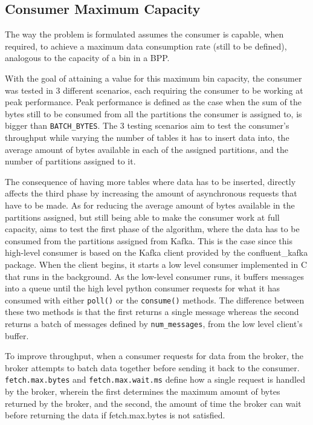 \subsection{Consumer Maximum Capacity}
\label{c3subsub:consumer_maximum_capacity}

The way the problem is formulated assumes the consumer is capable, when
required, to achieve a maximum data consumption rate (still to be defined),
analogous to the capacity of a bin in a BPP.

With the goal of attaining a value for this maximum bin capacity, the consumer
was tested in 3 different scenarios, each requiring the consumer to be working
at peak performance.  Peak performance is defined as the case when the sum of
the bytes still to be consumed from all the partitions the consumer is assigned
to, is bigger than \lstinline[language=Python]{BATCH_BYTES}.  The 3 testing
scenarios aim to test the consumer's throughput while varying the number of
tables it has to insert data into, the average amount of bytes available in each
of the assigned partitions, and the number of partitions assigned to it.

The consequence of having more tables where data has to be inserted, directly
affects the third phase by increasing the amount of asynchronous requests that
have to be made.  As for reducing the average amount of bytes available in the
partitions assigned, but still being able to make the consumer work at full
capacity, aims to test the first phase of the algorithm, where the data has to
be consumed from the partitions assigned from Kafka.  This is the case since
this high-level consumer is based on the Kafka client provided by the
confluent\_kafka package. When the client begins, it starts a low level consumer
implemented in C that runs in the background. As the low-level consumer runs, it
buffers messages into a queue until the high level python consumer requests for
what it has consumed with either \lstinline[language=Python]{poll()} or the
\lstinline[language=Python]{consume()} methods. The difference between these two
methods is that the first returns a single message whereas the second returns a
batch of messages defined by \lstinline{num_messages}, from the
low level client's buffer. 

To improve throughput, when a consumer requests for data from the broker, the
broker attempts to batch data together before sending it back to the consumer.
\lstinline{fetch.max.bytes} and
\lstinline{fetch.max.wait.ms} define how a single request is
handled by the broker, wherein the first determines the maximum amount of bytes
returned by the broker, and the second, the amount of time the broker can wait
before returning the data if fetch.max.bytes is not satisfied.

